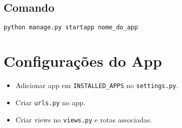 \subsection{Comando}
\begin{lstlisting}[language=bash]
python manage.py startapp nome_do_app
\end{lstlisting}

\section{Configura\c{c}\~oes do App}
\begin{itemize}
  \item Adicionar app em \texttt{INSTALLED\_APPS} no \texttt{settings.py}.
  \item Criar \texttt{urls.py} no app.
  \item Criar views no \texttt{views.py} e rotas associadas.
\end{itemize}